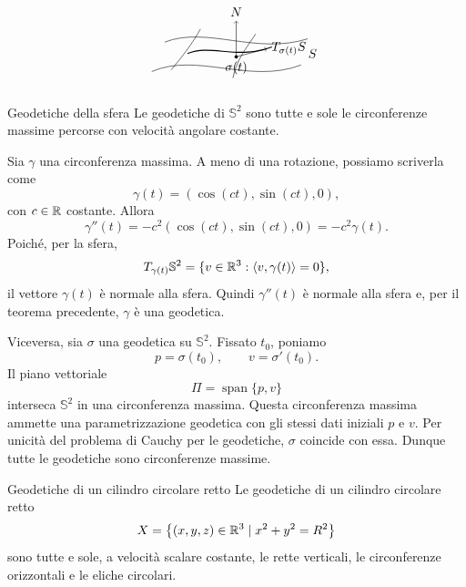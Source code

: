 \documentclass[a4paper]{article}
\begin{document}
\[
    \begin{tikzpicture}[scale=0.9]
        \draw (-0.4,0.2) .. controls (1.0,0.8) and (2.6,-0.2) .. (4.2,0.4);
        \draw (0,1.1) .. controls (1.3,1.6) and (2.8,0.7) .. (4.4,1.2);
        \draw (0.2,0.25) .. controls (0.7,0.85) and (0.9,1.15) .. (1.1,1.5);
        \draw (2.1,0.0) .. controls (2.2,0.55) and (2.5,0.9) .. (2.8,1.35);
        \draw[thick] (0.7,0.75) .. controls (1.45,1.05) and (2.2,0.55) .. (3.3,0.95);
        \fill (2.2,0.65) circle (1.5pt) node[below] {\(\sigma(t)\)};
        \draw[->] (2.2,0.65) -- (2.2,1.75) node[above] {\(N\)};
        \draw[->] (2.2,0.65) -- (3.15,0.9) node[right] {\(T_{\sigma(t)}S\)};
        \node at (4.55,0.75) {\(S\)};
    \end{tikzpicture}
\]

\begin{snippetcorollary}{Geodetiche della sfera}
Le geodetiche di \(\mathbb{S}^2\) sono tutte e sole le circonferenze massime percorse con velocità angolare costante.
\end{snippetcorollary}

\begin{snippetproof}{}
Sia \(\gamma\) una circonferenza massima. A meno di una rotazione, possiamo scriverla come
\[
    \gamma(t)=(\cos(ct),\sin(ct),0),
\]
con \(c\in\mathbb{R}\) costante. Allora
\[
    \gamma''(t)
    =
    -c^2(\cos(ct),\sin(ct),0)
    =
    -c^2\gamma(t).
\]
Poiché, per la sfera,
\[
    T_{\gamma(t)}\mathbb{S}^2
    =
    \{v\in\mathbb{R}^3:\langle v,\gamma(t)\rangle=0\},
\]
il vettore \(\gamma(t)\) è normale alla sfera. Quindi \(\gamma''(t)\) è normale alla sfera e, per il teorema precedente, \(\gamma\) è una geodetica.

Viceversa, sia \(\sigma\) una geodetica su \(\mathbb{S}^2\). Fissato \(t_0\), poniamo
\[
    p=\sigma(t_0),
    \qquad
    v=\sigma'(t_0).
\]
Il piano vettoriale
\[
    \Pi=\operatorname{span}\{p,v\}
\]
interseca \(\mathbb{S}^2\) in una circonferenza massima. Questa circonferenza massima ammette una parametrizzazione geodetica con gli stessi dati iniziali \(p\) e \(v\). Per unicità del problema di Cauchy per le geodetiche, \(\sigma\) coincide con essa. Dunque tutte le geodetiche sono circonferenze massime.
\end{snippetproof}



\begin{snippetproposition}{Geodetiche di un cilindro circolare retto}
    Le geodetiche di un cilindro circolare retto
    \[
        X=\left\{(x,y,z)\in\mathbb{R}^3\mid x^2+y^2=R^2\right\}
    \]
    sono tutte e sole, a velocità scalare costante, le rette verticali, le circonferenze
    orizzontali e le eliche circolari.
\end{snippetproposition}
\end{document}
